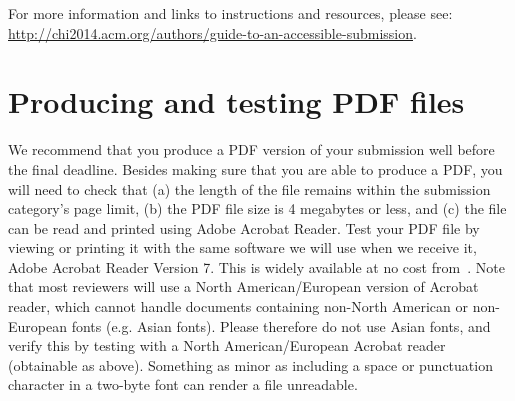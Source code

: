 \documentclass{chi-ext}
\begin{document}
For more information and links to instructions and resources, please see:
{\url{http://chi2014.acm.org/authors/guide-to-an-accessible-submission}}.

\section{Producing and testing PDF files}
We recommend that you produce a PDF version of your submission well before the final deadline. 
Besides making sure that you are able to produce a PDF, you will need to check that (a) the length of the file remains within the submission category's page limit, (b) the PDF file size is 4 megabytes or less, and (c) the file can be read and printed using Adobe Acrobat Reader. 
Test your PDF file by viewing or printing it with the same software we will use when we receive it, Adobe Acrobat Reader Version 7. 
This is widely available at no cost from~\cite{Acrobat7}.  
Note that most reviewers will use a North American/European version of Acrobat reader, which cannot handle documents containing non-North American or non-European fonts (e.g. Asian fonts).  
Please therefore do not use Asian fonts, and verify this by testing with a North American/European Acrobat reader (obtainable as above). Something as minor as including a space or punctuation character in a two-byte font can render a file unreadable.

\end{document}
